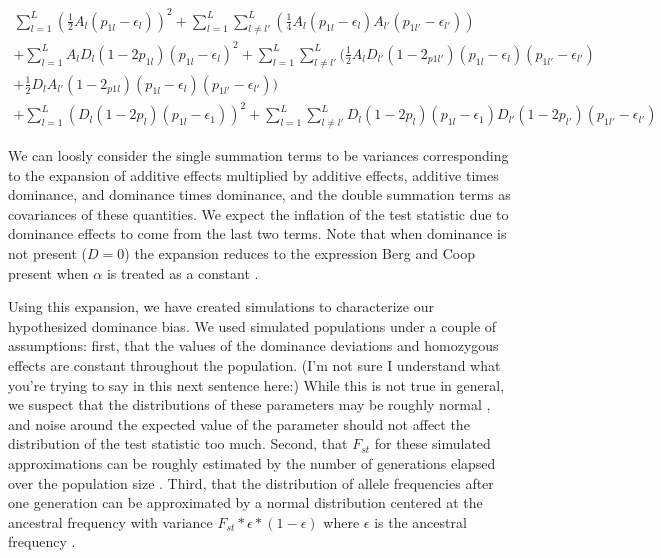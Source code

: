 \documentclass[a4paper,12pt]{article}
\newcommand{\jb}[1]{{\color{blue} (#1)} }
\begin{document}
\begin{equation}
  \begin{split}
  \sum^L_{l=1}( \frac{1}{2}A_l(p_{1l}-\epsilon_l))^2+\sum^L_{l=1}\sum^L_{
    l \neq l'}(\frac{1}{4}A_l(p_{1l}-\epsilon_{l})A_{l'}(p_{1l'}-\epsilon_{l'}))
  \\
  +\sum^L_{l=1}A_lD_l(1-2p_{1l})(p_{1l}-\epsilon_l)^2 +
  \sum^L_{l=1}\sum^L_{l \neq
    l'}(\frac{1}{2}A_lD_{l'}(1-2_{p1l'})(p_{1l}-\epsilon_l)(p_{1l'}-\epsilon_{l'}) \\
  + \frac{1}{2}D_lA_{l'}(1-2_{p1l})(p_{1l}-\epsilon_l)(p_{1l'}-\epsilon_{l'})) \\
   + \sum^L_{l=1} (D_l(1-2p_l)(p_{1l}-\epsilon_{1}))^2
   + \sum^L_{l=1}\sum^L_{l \neq
     l'}D_{l}(1-2p_{l})(p_{1l}-\epsilon_{1})D_{l'}(1-2p_{l'})(p_{1l'}-\epsilon_{l'}) \label{expansion}
  \end{split}
\end{equation}

We can loosly consider the single summation terms to be variances
corresponding to the expansion of additive effects multiplied by
additive effects, additive times dominance, and dominance times
dominance, and the double summation terms as covariances of these
quantities. We expect the inflation of the test statistic due to
dominance effects to come from the last two terms. Note that when
dominance is not present ($D=0$) the expansion reduces to the
expression Berg and Coop present when $\alpha$ is treated as a constant
\cite{berg}.

Using this expansion, we have created simulations to characterize our
hypothesized dominance bias. We used simulated populations
under a couple of assumptions: first, that the values of the dominance
deviations and homozygous effects are constant throughout the
population. \jb{I'm not sure I understand what you're trying to say in this next sentence here:} While this is not true in general, we suspect that the
distributions of these parameters may be roughly normal
\cite{normaldist}, and noise around the expected value of the
parameter should not affect the distribution of the test statistic too
much. Second, that $F_{st}$ for these simulated approximations
can be roughly estimated by the number of generations elapsed over the
population size \cite{Fstest}. Third, that the distribution of allele frequencies after
one generation can be approximated by a normal distribution centered
at the ancestral frequency with variance
$F_{st}*\epsilon*(1-\epsilon)$ where $\epsilon$ is the ancestral
frequency \cite{gillespie}.
\end{document}
